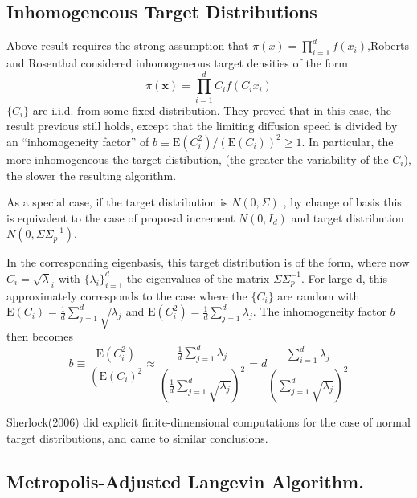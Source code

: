 \documentclass[
]{book}
\theoremstyle{definition}
\theoremstyle{definition}
\theoremstyle{definition}
\theoremstyle{remark}
\begin{document}
\hypertarget{inhomogeneous-target-distributions}{%
\subsection{Inhomogeneous Target Distributions}\label{inhomogeneous-target-distributions}}

Above result requires the strong assumption that \(\pi(x)=\prod ^d_{i=1}f(x_i)\),Roberts and Rosenthal considered inhomogeneous target densities of the form
\[
\pi(\mathbf{x})=\prod_{i=1}^{d} C_{i} f\left(C_{i} x_{i}\right)
\]
\(\{C_i\}\) are i.i.d. from some fixed distribution. They proved that in this case, the result previous still holds, except that the limiting diffusion speed is divided by an ``inhomogeneity factor'' of \(b \equiv \mathrm{E}\left(C_{i}^{2}\right) /\left(\mathrm{E}\left(C_{i}\right)\right)^{2} \geq 1\). In particular, the more inhomogeneous the target distibution, (the greater the variability of the \(C_i\)), the slower the resulting algorithm.

As a special case, if the target distribution is \(N(0,\Sigma)\) , by change of basis this is equivalent to the case of proposal increment \(N(0,I_d)\) and target distribution \(N(0,\Sigma\Sigma_p^{-1})\).

In the corresponding eigenbasis, this target distribution is of the form, where now \(C_i=\sqrt\lambda_i\) with \(\{\lambda_i\}^d_{i=1}\) the eigenvalues of the matrix \(\Sigma\Sigma_p^{-1}\). For large d, this approximately corresponds to the case where the \(\{C_i\}\) are random with \(\mathrm{E}\left(C_{i}\right)=\frac{1}{d} \sum_{j=1}^{d} \sqrt{\lambda_{j}}\) and \(\mathrm{E}\left(C_{i}^{2}\right)=\frac{1}{d} \sum_{j=1}^{d} \lambda_{j}\). The inhomogeneity factor \(b\) then becomes
\[
b \equiv \frac{\mathrm{E}\left(C_{i}^{2}\right)}{\left(\mathrm{E}\left(C_{i}\right)^{2}\right.} \approx \frac{\frac{1}{d} \sum_{j=1}^{d} \lambda_{j}}{\left(\frac{1}{d} \sum_{j=1}^{d} \sqrt{\lambda_{j}}\right)^{2}}=d \frac{\sum_{i=1}^{d} \lambda_{j}}{\left(\sum_{j=1}^{d} \sqrt{\lambda_{j}}\right)^{2}}
\]

Sherlock(2006) did explicit finite-dimensional computations for the case of normal target distributions, and came to similar conclusions.

\hypertarget{metropolis-adjusted-langevin-algorithm.}{%
\subsection{Metropolis-Adjusted Langevin Algorithm.}\label{metropolis-adjusted-langevin-algorithm.}}
\end{document}
